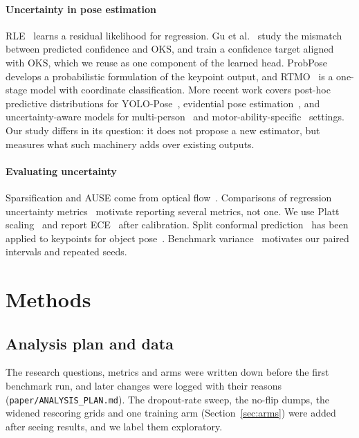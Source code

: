 \documentclass[preprint,11pt]{elsarticle}
\begin{document}
\paragraph{Uncertainty in pose estimation} RLE~\cite{li2021rle} learns a residual likelihood for
regression. Gu et al.~\cite{gu2024calibration} study the mismatch between predicted confidence
and OKS, and train a confidence target aligned with OKS, which we reuse as one component of the
learned head. ProbPose~\cite{purkrabek2025probpose} develops a probabilistic formulation of the
keypoint output, and RTMO~\cite{lu2024rtmo} is a one-stage model with coordinate classification.
More recent work covers post-hoc predictive distributions for YOLO-Pose~\cite{klushyn2026yolopose},
evidential pose estimation~\cite{henriques2026evidential}, and uncertainty-aware models for
multi-person~\cite{huu2025contextual} and motor-ability-specific~\cite{wang2026motor} settings.
Our study differs in its question: it does not propose a new estimator, but measures what such
machinery adds over existing outputs.

\paragraph{Evaluating uncertainty} Sparsification and AUSE come from optical
flow~\cite{ilg2018uncertainty}. Comparisons of regression uncertainty
metrics~\cite{lind2024metrics,levi2022evaluating} motivate reporting several metrics, not one.
We use Platt scaling~\cite{platt1999probabilistic} and report ECE~\cite{guo2017calibration} after
calibration. Split conformal
prediction~\cite{angelopoulos2021gentle} has been applied to keypoints for object
pose~\cite{yang2023conformal}. Benchmark variance~\cite{bouthillier2021variance} motivates our
paired intervals and repeated seeds.

\section{Methods}

\subsection{Analysis plan and data}\label{sec:plan}

The research questions, metrics and arms were written down before the first benchmark run, and
later changes were logged with their reasons (\texttt{paper/ANALYSIS\_PLAN.md}). The dropout-rate
sweep, the no-flip dumps, the widened rescoring grids and one training arm
(Section~\ref{sec:arms}) were added after seeing results, and we label them exploratory.
\end{document}
